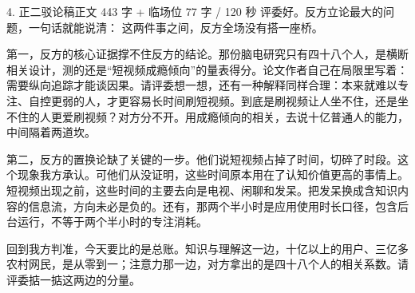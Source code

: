 \documentclass[script,pro]{debate}
\begin{document}
\begin{speech}{4. 正二驳论稿}{正文 443 字 + 临场位 77 字 / 120 秒}
评委好。反方立论最大的问题，一句话就能说清： 这两件事之间，反方全场没有搭一座桥。

第一，反方的核心证据撑不住反方的结论。那份脑电研究只有四十八个人，是横断相关设计，测的还是“短视频成瘾倾向”的量表得分。论文作者自己在局限里写着：需要纵向追踪才能谈因果。请评委想一想，还有一种解释同样合理：本来就难以专注、自控更弱的人，才更容易长时间刷短视频。到底是刷视频让人坐不住，还是坐不住的人更爱刷视频？对方分不开。用成瘾倾向的相关，去说十亿普通人的能力，中间隔着两道坎。

第二，反方的置换论缺了关键的一步。他们说短视频占掉了时间，切碎了时段。这个现象我方承认。可他们从没证明，这些时间原本用在了认知价值更高的事情上。短视频出现之前，这些时间的主要去向是电视、闲聊和发呆。把发呆换成含知识内容的信息流，方向未必是负的。还有，那两个半小时是应用使用时长口径，包含后台运行，不等于两个半小时的专注消耗。

回到我方判准，今天要比的是总账。知识与理解这一边，十亿以上的用户、三亿多农村网民，是从零到一；注意力那一边，对方拿出的是四十八个人的相关系数。请评委掂一掂这两边的分量。

\begin{contingency}
\end{contingency}
\end{speech}
\end{document}
